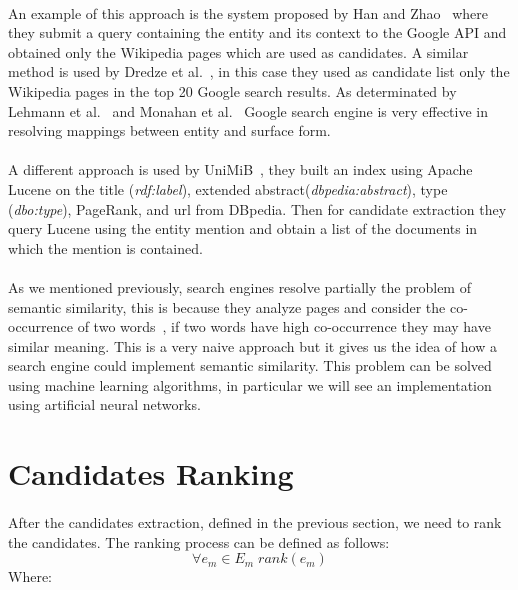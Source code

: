 \paragraph{}
An example of this approach is the system proposed by Han and Zhao~\cite{han2009nlpr_kbp} where they submit a query containing the entity and its context to the Google API and obtained only the Wikipedia pages which are used as candidates. A similar method is used by Dredze et al.~\cite{dredze2010entity}, in this case they used as candidate list only the Wikipedia pages in the top 20 Google search results. As determinated by Lehmann et al.~\cite{lehmann2010lcc} and Monahan et al.~\cite{monahan2011cross} Google search engine is very effective in resolving mappings between entity and surface form.

\paragraph{}
A different approach is used by UniMiB~\cite{caliano2016unimib}, they built an index using Apache Lucene on the title (\textit{rdf:label}), extended abstract(\textit{dbpedia:abstract}), type (\textit{dbo:type}), PageRank, and url from DBpedia. Then for candidate extraction they query Lucene using the entity mention and obtain a list of the documents in which the mention is contained.

\paragraph{}
As we mentioned previously, search engines resolve partially the problem of semantic similarity, this is because they analyze pages and consider the co-occurrence of two words~\cite{bollegala2007measuring}, if two words have high co-occurrence they may have similar meaning. This is a very naive approach but it gives us the idea of how a search engine could implement semantic similarity. This problem can be solved using machine learning algorithms, in particular we will see an implementation using artificial neural networks.

\section{Candidates Ranking}
\paragraph{}
After the candidates extraction, defined in the previous section, we need to rank the candidates. The ranking process can be defined as follows:
\[\forall e_m \in E_m \; rank(e_m)\]
Where:

